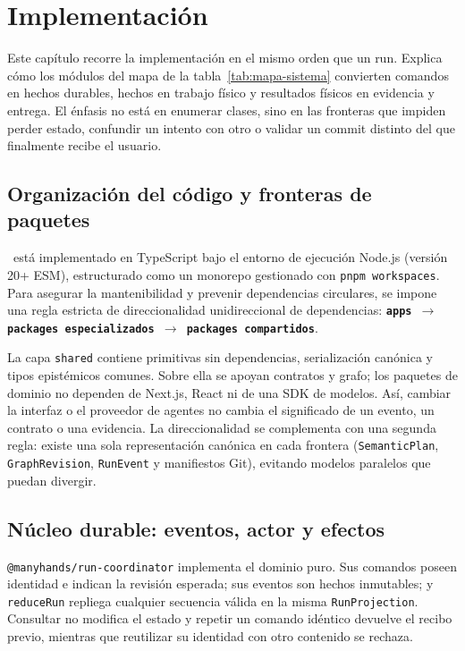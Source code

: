 \chapter{Implementación}
\label{cap:implementacion}

Este capítulo recorre la implementación en el mismo orden que un run. Explica
cómo los módulos del mapa de la tabla~\ref{tab:mapa-sistema} convierten comandos
en hechos durables, hechos en trabajo físico y resultados físicos en evidencia
y entrega. El énfasis no está en enumerar clases, sino en las fronteras que
impiden perder estado, confundir un intento con otro o validar un commit
distinto del que finalmente recibe el usuario.

\section{Organización del código y fronteras de paquetes}

\sistema\ está implementado en TypeScript bajo el entorno de ejecución Node.js (versión 20+ ESM), estructurado como un monorepo gestionado con \texttt{pnpm workspaces}. Para asegurar la mantenibilidad y prevenir dependencias circulares, se impone una regla estricta de direccionalidad unidireccional de dependencias: \textbf{\texttt{apps $\rightarrow$ packages especializados $\rightarrow$ packages compartidos}}.

La capa \texttt{shared} contiene primitivas sin dependencias, serialización
canónica y tipos epistémicos comunes. Sobre ella se apoyan contratos y grafo;
los paquetes de dominio no dependen de Next.js, React ni de una SDK de modelos.
Así, cambiar la interfaz o el proveedor de agentes no cambia el significado de
un evento, un contrato o una evidencia. La direccionalidad se complementa con
una segunda regla: existe una sola representación canónica en cada frontera
(\texttt{SemanticPlan}, \texttt{GraphRevision}, \texttt{RunEvent} y manifiestos
Git), evitando modelos paralelos que puedan divergir.

\section{Núcleo durable: eventos, actor y efectos}
\label{sec:nucleo-durable}

\texttt{@manyhands/run-coordinator} implementa el dominio puro. Sus comandos
poseen identidad e indican la revisión esperada; sus eventos son hechos
inmutables; y \texttt{reduceRun} repliega cualquier secuencia válida en la misma
\texttt{RunProjection}. Consultar no modifica el estado y repetir un comando
idéntico devuelve el recibo previo, mientras que reutilizar su identidad con
otro contenido se rechaza.

